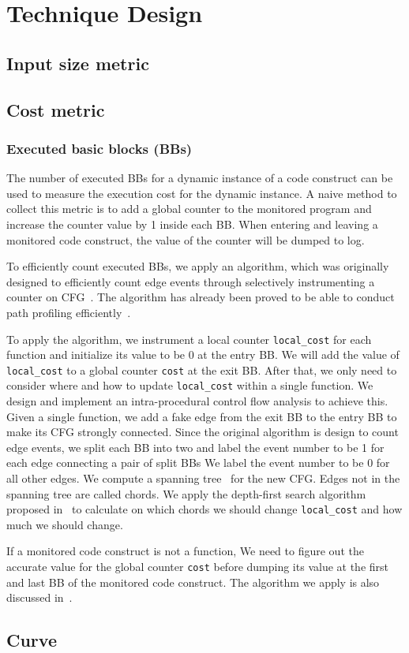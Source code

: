 \section{Technique Design}
\label{sec:design}

\subsection{Input size metric}


\subsection{Cost metric}

\subsubsection{Executed basic blocks (BBs)}
The number of executed BBs for a dynamic instance of a code construct
can be used to measure the execution cost for the dynamic instance. 
A naive method to collect this metric is to add a global counter 
to the monitored program and increase the counter value by 1 inside each BB.  
When entering and leaving a monitored code construct, 
the value of the counter will be dumped to log.

To efficiently count executed BBs, 
we apply an algorithm, which was originally designed to 
efficiently count edge events through selectively instrumenting a counter 
on CFG~\cite{event-counting}.
The algorithm has already been proved to be able to 
conduct path profiling efficiently~\cite{peter-ase,path-profiling}. 



To apply the algorithm,
we instrument a local counter \texttt{local\_cost} for each function
and initialize its value to be 0 at the entry BB. 
We will add the value of \texttt{local\_cost} to a global counter \texttt{cost} 
at the exit BB.
After that, we only need to consider where 
and how to update \texttt{local\_cost} 
within a single function.
We design and implement an intra-procedural control flow analysis
to achieve this.
Given a single function,
we add a fake edge from the exit BB to the entry BB 
to make its CFG strongly connected. 
Since the original algorithm is design to count edge events,
we split each BB into two 
and label the event number to be 1 for each edge connecting a pair of split BBs 
We label the event number to be 0 for all other edges.
We compute a spanning tree~\cite{spanning} for the new CFG.
Edges not in the spanning tree are called chords.
We apply the depth-first search algorithm proposed in~\cite{event-counting} 
to calculate on which chords we should change 
\texttt{local\_cost} 
and how much we should change.

If a monitored code construct is not a function,
We need to figure out the accurate value for the global counter \texttt{cost} 
before dumping its value 
at the first and last BB of the monitored code construct.
The algorithm we apply is also discussed in~\cite{event-counting}.




\subsection{Curve}